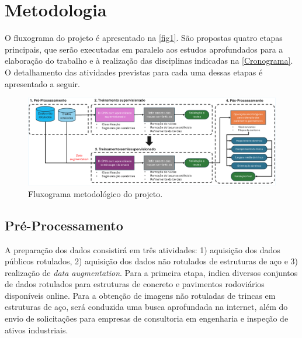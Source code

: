 \documentclass[12pt]{article}
\begin{document}
\section{Metodologia}

O fluxograma do projeto é apresentado na \autoref{fig1}. São propostas quatro etapas principais, que serão executadas em paralelo aos estudos aprofundados para a elaboração do trabalho e à realização das disciplinas indicadas na \autoref{Cronograma}. O detalhamento das atividades previstas para cada uma dessas etapas é apresentado a seguir.

\begin{figure}[h]
  \centering
  \includegraphics[width=\textwidth]{imagens/metodologia_PPP2_cropped.pdf}
  \setlength{\abovecaptionskip}{0pt} %
  \vspace{-10pt}
  \caption{Fluxograma metodológico do projeto.}
  \label{fig1}
\end{figure}
\vspace{-5pt}
\subsection{Pré-Processamento}
A preparação dos dados consistirá em três atividades: 1) aquisição dos dados públicos rotulados, 2) aquisição dos dados não rotulados de estruturas de aço e 3) realização de \textit{data augmentation}. Para a primeira etapa, \textcite{14konig2022s} indica diversos conjuntos de dados rotulados para estruturas de concreto e pavimentos rodoviários disponíveis online. Para a obtenção de imagens não rotuladas de trincas em estruturas de aço, será conduzida uma busca aprofundada na internet, além do envio de solicitações para empresas de consultoria em engenharia e inspeção de ativos industriais. 
\end{document}
